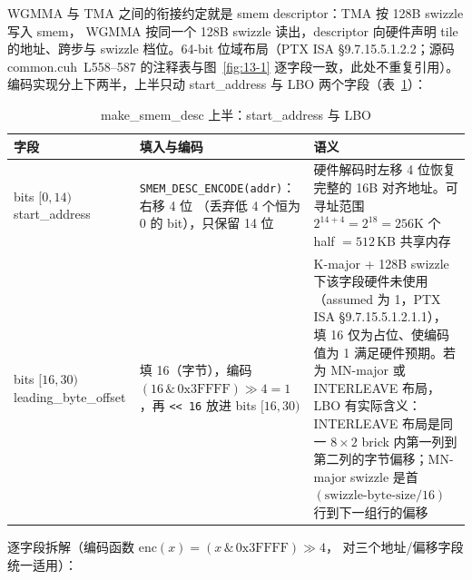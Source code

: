 WGMMA 与 TMA 之间的衔接约定就是 smem descriptor：TMA 按 128B swizzle 写入 smem，
WGMMA 按同一个 128B swizzle 读出，descriptor 向硬件声明 tile 的地址、跨步与
swizzle 档位。64-bit 位域布局（PTX ISA §9.7.15.5.1.2.2；源码
common.cuh~L558--587 的注释表与图~\ref{fig:13-1} 逐字段一致，此处不重复引用）。
编码实现分上下两半，上半只动 start\_address 与 LBO 两个字段（表~\ref{tab:13-desc-upper}）：

\begin{table}[htbp]
\centering
\caption{make\_smem\_desc 上半：start\_address 与 LBO}
\label{tab:13-desc-upper}
\small
\begin{tabular}{@{}p{3.7cm}p{3.3cm}p{10.45cm}@{}}
\toprule
字段 & 填入与编码 & 语义 \\
\midrule
bits $[0,14)$ start\_address &
  \texttt{SMEM\_\allowbreak{}DESC\_\allowbreak{}ENCODE(addr)}：右移 4 位
  （丢弃低 4 个恒为 0 的 bit），只保留 14 位 &
  硬件解码时左移 4 位恢复完整的 16B 对齐地址。可寻址范围
  $2^{14+4} = 2^{18} = 256\mathrm{K}$ 个 half $= 512$\,KB 共享内存 \\
bits $[16,30)$ leading\_byte\_offset &
  填 16（字节），编码 $(16 \,\&\, \mathrm{0x3FFFF}) \gg 4 = 1$，再
  \texttt{<< 16} 放进 bits $[16, 30)$ &
  K-major + 128B swizzle 下该字段硬件未使用（assumed 为 1，PTX ISA
  §9.7.15.5.1.2.1.1），填 16 仅为占位、使编码值为 1 满足硬件预期。若为
  MN-major 或 INTERLEAVE 布局，LBO 有实际含义：INTERLEAVE 布局是同一
  $8\times2$ brick 内第一列到第二列的字节偏移；MN-major swizzle 是首
  $(\text{swizzle-byte-size}/16)$ 行到下一组行的偏移 \\
\bottomrule
\end{tabular}
\end{table}



逐字段拆解（编码函数 $\mathrm{enc}(x) = (x \,\&\, \mathrm{0x3FFFF}) \gg 4$，
对三个地址/偏移字段统一适用）：

